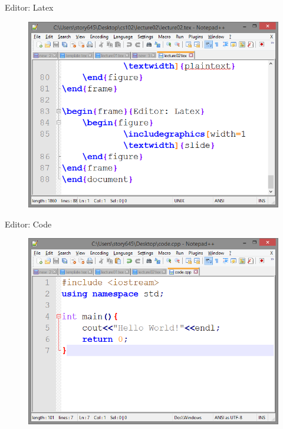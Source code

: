 \documentclass[xcolor={dvipsnames}]{beamer}
\begin{document}
\begin{frame}{Editor: Latex}
	\begin{figure}
			\includegraphics[width=1\textwidth]{slide}
	\end{figure}
\end{frame}

\begin{frame}{Editor: Code}
	\begin{figure}
			\includegraphics[width=1\textwidth]{code}
	\end{figure}
\end{frame}
\end{document}

